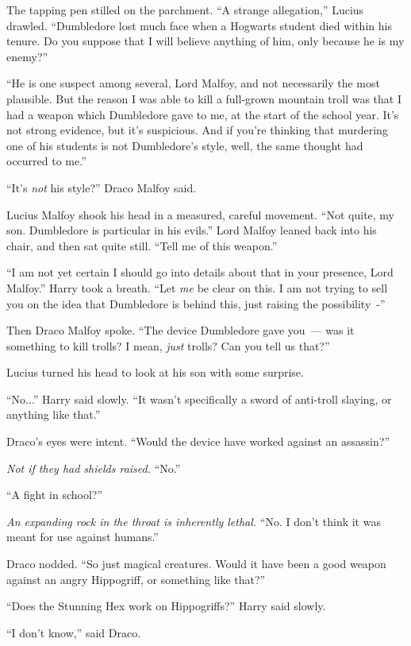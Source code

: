The tapping pen stilled on the parchment. ``A strange allegation,'' Lucius drawled. ``Dumbledore lost much face when a Hogwarts student died within his tenure. Do you suppose that I will believe anything of him, only because he is my enemy?''

``He is one suspect among several, Lord Malfoy, and not necessarily the most plausible. But the reason I was able to kill a full-grown mountain troll was that I had a weapon which Dumbledore gave to me, at the start of the school year. It's not strong evidence, but it's suspicious. And if you're thinking that murdering one of his students is not Dumbledore's style, well, the same thought had occurred to me.''

``It's \emph{not} his style?'' Draco Malfoy said.

Lucius Malfoy shook his head in a measured, careful movement. ``Not quite, my son. Dumbledore is particular in his evils.'' Lord Malfoy leaned back into his chair, and then sat quite still. ``Tell me of this weapon.''

``I am not yet certain I should go into details about that in your presence, Lord Malfoy.'' Harry took a breath. ``Let \emph{me} be clear on this. I am not trying to sell you on the idea that Dumbledore is behind this, just raising the possibility~-''

Then Draco Malfoy spoke. ``The device Dumbledore gave you~--- was it something to kill trolls? I mean, \emph{just} trolls? Can you tell us that?''

Lucius turned his head to look at his son with some surprise.

``No...'' Harry said slowly. ``It wasn't specifically a sword of anti-troll slaying, or anything like that.''

Draco's eyes were intent. ``Would the device have worked against an assassin?''

\emph{Not if they had shields raised.} ``No.''

``A fight in school?''

\emph{An expanding rock in the throat is inherently lethal.} ``No. I don't think it was meant for use against humans.''

Draco nodded. ``So just magical creatures. Would it have been a good weapon against an angry Hippogriff, or something like that?''

``Does the Stunning Hex work on Hippogriffs?'' Harry said slowly.

``I don't know,'' said Draco.

